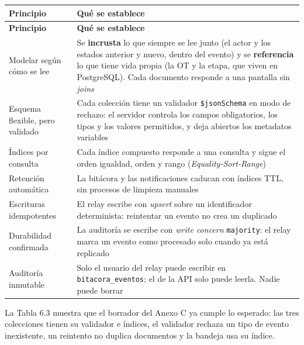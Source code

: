 \documentclass[11pt,a4paper]{article}
\begin{document}
\begingroup
\begin{longtable}{@{}>{\raggedright\arraybackslash\hspace{0pt}}p{}>{\raggedright\arraybackslash\hspace{0pt}}p{}@{}}
\toprule
\textbf{Principio} & \textbf{Qué se establece} \\ \midrule
\endfirsthead
\toprule
\textbf{Principio} & \textbf{Qué se establece} \\ \midrule
\endhead
\bottomrule
\endlastfoot
Modelar según cómo se lee & Se \textbf{incrusta} lo que siempre se lee junto (el actor y los estados anterior y nuevo, dentro del evento) y se \textbf{referencia} lo que tiene vida propia (la OT y la etapa, que viven en PostgreSQL). Cada documento responde a una pantalla sin \textit{joins} \\ \addlinespace[0.25em]
Esquema flexible, pero validado & Cada colección tiene un validador \texttt{\$json\allowbreak{}Schema} en modo de rechazo: el servidor controla los campos obligatorios, los tipos y los valores permitidos, y deja abiertos los metadatos variables \\ \addlinespace[0.25em]
Índices por consulta & Cada índice compuesto responde a una consulta y sigue el orden igualdad, orden y rango (\textit{Equality-Sort-Range}) \\ \addlinespace[0.25em]
Retención automática & La bitácora y las notificaciones caducan con índices TTL, sin procesos de limpieza manuales \\ \addlinespace[0.25em]
Escrituras idempotentes & El relay escribe con \textit{upsert} sobre un identificador determinista: reintentar un evento no crea un duplicado \\ \addlinespace[0.25em]
Durabilidad confirmada & La auditoría se escribe con \textit{write concern} \texttt{majority}: el relay marca un evento como procesado solo cuando ya está replicado \\ \addlinespace[0.25em]
Auditoría inmutable & Solo el usuario del relay puede escribir en \texttt{bitacora\_\allowbreak{}eventos}; el de la API solo puede leerla. Nadie puede borrar \\
\end{longtable}
\endgroup

La Tabla 6.3 muestra que el borrador del Anexo C ya cumple lo esperado: las tres colecciones tienen su validador e índices, el validador rechaza un tipo de evento inexistente, un reintento no duplica documentos y la bandeja usa su índice.
\end{document}
